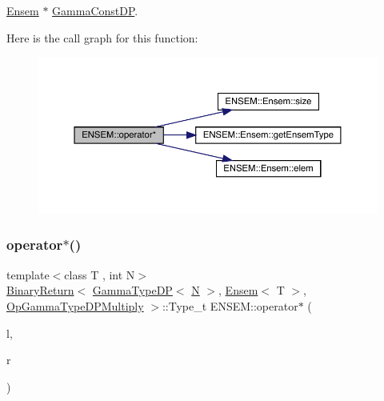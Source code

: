 \mbox{\hyperlink{classENSEM_1_1Ensem}{Ensem}} $\ast$ \mbox{\hyperlink{classENSEM_1_1GammaConstDP}{Gamma\+Const\+DP}}. 

Here is the call graph for this function\+:\nopagebreak
\begin{figure}[H]
\begin{center}
\leavevmode
\includegraphics[width=350pt]{d1/d9e/group__eensem_ga0377e46872c4fb569a240b0b60ef577e_cgraph}
\end{center}
\end{figure}
\mbox{\label{group__eensem_ga53d61b0a5109e4f59f7b77a3fb4817f9}} 
\subsubsection{\texorpdfstring{operator$\ast$()}{operator*()}\hspace{0.1cm}{\footnotesize\ttfamily [10/11]}}
{\footnotesize\ttfamily template$<$class T , int N$>$ \\
\mbox{\hyperlink{structENSEM_1_1BinaryReturn}{Binary\+Return}}$<$ \mbox{\hyperlink{classENSEM_1_1GammaTypeDP}{Gamma\+Type\+DP}}$<$ \mbox{\hyperlink{operator__name__util_8cc_a7722c8ecbb62d99aee7ce68b1752f337}{N}} $>$, \mbox{\hyperlink{classENSEM_1_1Ensem}{Ensem}}$<$ T $>$, \mbox{\hyperlink{structENSEM_1_1OpGammaTypeDPMultiply}{Op\+Gamma\+Type\+D\+P\+Multiply}} $>$\+::Type\+\_\+t E\+N\+S\+E\+M\+::operator$\ast$ (\begin{DoxyParamCaption}\item[{const \mbox{\hyperlink{classENSEM_1_1GammaTypeDP}{Gamma\+Type\+DP}}$<$ \mbox{\hyperlink{operator__name__util_8cc_a7722c8ecbb62d99aee7ce68b1752f337}{N}} $>$ \&}]{l,  }\item[{const \mbox{\hyperlink{classENSEM_1_1Ensem}{Ensem}}$<$ T $>$ \&}]{r }\end{DoxyParamCaption})\hspace{0.3cm}{\ttfamily [inline]}}



